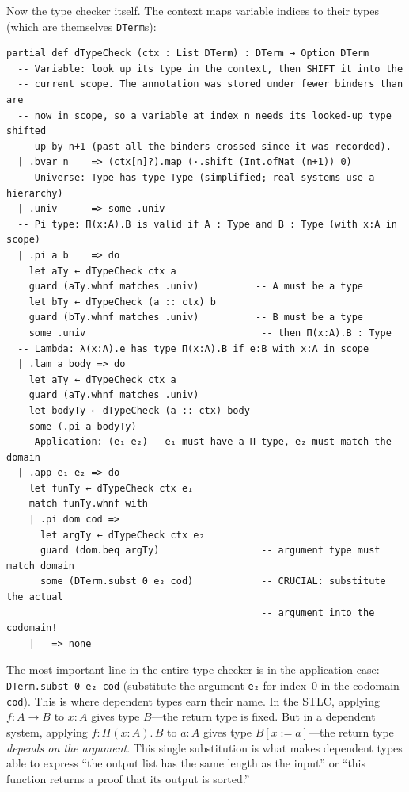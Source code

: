 \documentclass[11pt,a4paper]{article}
\theoremstyle{definition}
\begin{document}
Now the type checker itself. The context maps variable indices to their types
(which are themselves \texttt{DTerm}s):

\begin{verbatim}
partial def dTypeCheck (ctx : List DTerm) : DTerm → Option DTerm
  -- Variable: look up its type in the context, then SHIFT it into the
  -- current scope. The annotation was stored under fewer binders than are
  -- now in scope, so a variable at index n needs its looked-up type shifted
  -- up by n+1 (past all the binders crossed since it was recorded).
  | .bvar n    => (ctx[n]?).map (·.shift (Int.ofNat (n+1)) 0)
  -- Universe: Type has type Type (simplified; real systems use a hierarchy)
  | .univ      => some .univ
  -- Pi type: Π(x:A).B is valid if A : Type and B : Type (with x:A in scope)
  | .pi a b    => do
    let aTy ← dTypeCheck ctx a
    guard (aTy.whnf matches .univ)          -- A must be a type
    let bTy ← dTypeCheck (a :: ctx) b
    guard (bTy.whnf matches .univ)          -- B must be a type
    some .univ                               -- then Π(x:A).B : Type
  -- Lambda: λ(x:A).e has type Π(x:A).B if e:B with x:A in scope
  | .lam a body => do
    let aTy ← dTypeCheck ctx a
    guard (aTy.whnf matches .univ)
    let bodyTy ← dTypeCheck (a :: ctx) body
    some (.pi a bodyTy)
  -- Application: (e₁ e₂) — e₁ must have a Π type, e₂ must match the domain
  | .app e₁ e₂ => do
    let funTy ← dTypeCheck ctx e₁
    match funTy.whnf with
    | .pi dom cod =>
      let argTy ← dTypeCheck ctx e₂
      guard (dom.beq argTy)                  -- argument type must match domain
      some (DTerm.subst 0 e₂ cod)            -- CRUCIAL: substitute the actual
                                             -- argument into the codomain!
    | _ => none
\end{verbatim}

\begin{intuition}
The most important line in the entire type checker is in the application case:
\texttt{DTerm.subst 0 e₂ cod} (substitute the argument \texttt{e₂} for
index~0 in the codomain \texttt{cod}). This is where dependent types earn their name. In
the STLC, applying $f : A \to B$ to $x : A$ gives type $B$---the return type
is fixed. But in a dependent system, applying $f : \Pi(x{:}A).\, B$ to $a : A$
gives type $B[x := a]$---the return type \emph{depends on the argument}. This
single substitution is what makes dependent types able to express ``the output
list has the same length as the input'' or ``this function returns a proof that
its output is sorted.''
\end{intuition}
\end{document}
